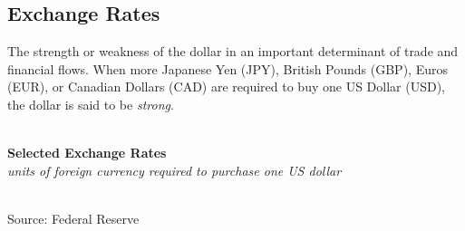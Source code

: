 \documentclass{report}
\makeatletter
\newcommand{\tbllink}[1]{\href{https://raw.githubusercontent.com/bdecon/US-chartbook/master/chartbook/data/#1}{\faTable}}
\newcommand*\short[1]{\expandafter\@gobbletwo\number\numexpr#1\relax}
\newcommand{\stdnode}[3]{\node[below, align=left, shift=({#1,#2})]{#3};}
\newcommand{\dateaxisticks}{
		date coordinates in=x, axis line style={draw=none},
		xmax={2020-05-10},
		max space between ticks=40,	    
		xtick={{1990-01-01}, {1992-01-01}, {1994-01-01}, 
			{1996-01-01}, {1998-01-01}, {2000-01-01}, 
			{2002-01-01}, {2004-01-01}, {2006-01-01},
			{2008-01-01}, {2010-01-01}, {2012-01-01}, {2014-01-01},
		    {2016-01-01}, {2018-01-01}, {2020-01-01}},
		minor xtick={{1989-01-01}, {1991-01-01}, {1993-01-01},
			{1995-01-01}, {1997-01-01}, {1999-01-01}, 
			{2001-01-01}, {2003-01-01}, {2005-01-01}, {2007-01-01},
		    {2009-01-01}, {2011-01-01}, {2013-01-01}, {2015-01-01},
		    {2017-01-01}, {2019-01-01}},
		enlarge y limits={0.06}, enlarge x limits={0.01},
		}
\newcommand{\bbar}[2]{extra #1 ticks = {{#2}}, extra #1 tick labels = ,
		extra #1 tick style = {grid=major, grid style={thick, black!25}},}
\newcommand{\stdline}[4]{\addplot[very thick, no markers, color=#1] 
		table [x=#2, y=#3, col sep=comma] {#4};	}
\newcommand{\rbars}{
		\fill[color=black!10] (axis cs:{1990-07-01},\pgfkeysvalueof{/pgfplots/ymin}) rectangle 
			(axis cs:{1991-03-01}, \pgfkeysvalueof{/pgfplots/ymax});
		\fill[color=black!10] (axis cs:{2007-12-01},\pgfkeysvalueof{/pgfplots/ymin}) rectangle 
			(axis cs:{2009-07-01}, \pgfkeysvalueof{/pgfplots/ymax});
		\fill[color=black!10] (axis cs:{2001-03-01},\pgfkeysvalueof{/pgfplots/ymin}) rectangle 
			(axis cs:{2001-11-01}, \pgfkeysvalueof{/pgfplots/ymax});}
\makeatother
\begin{document}
{{{{{{{\begin{minipage}{0.76\textwidth}

\subsection*{\color{black!70} \seriffont Exchange Rates}

\small The strength or weakness of the dollar in an important determinant of trade and financial flows. When more Japanese Yen (JPY), British Pounds (GBP), Euros (EUR), or Canadian Dollars (CAD) are required to buy one US Dollar (USD), the dollar is said to be \textit{strong}.\\

 \\ 

\vspace{2mm}

\noindent \normalsize \textbf{Selected Exchange Rates}\\
\footnotesize{\textit{units of foreign currency required to purchase one US dollar}}\\
\noindent \hspace*{-2mm} \\
\footnotesize{Source: Federal Reserve} \hfill \tbllink{fx1.csv}
\end{minipage}

}}}}}}}
\end{document}
